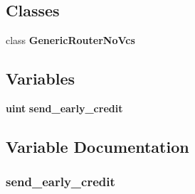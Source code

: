 \subsection*{Classes}
\begin{CompactItemize}
\item 
class {\bf GenericRouterNoVcs}
\end{CompactItemize}
\subsection*{Variables}
\begin{CompactItemize}
\item 
{\bf uint} {\bf send\_\-early\_\-credit}
\end{CompactItemize}


\subsection{Variable Documentation}
\subsubsection[{send\_\-early\_\-credit}]{ {\bf send\_\-early\_\-credit}}\label{genericRouterNoVcs_8h_97bd678cd4246f1a0157eff907e3fea1}


